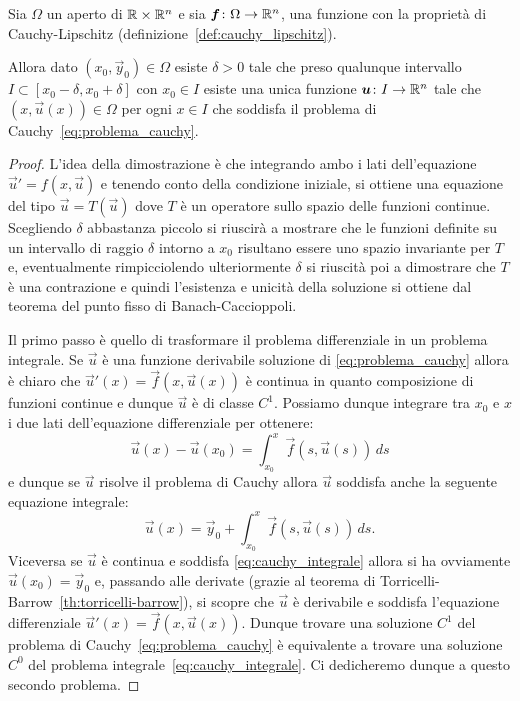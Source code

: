 \begin{theorem}
\label{th:cauchy_lipschitz}
\mymark{***}
Sia $\Omega$ un aperto di $\mathbb R\times \mathbb R^n$ e sia $\boldsymbol f\colon \Omega \to \mathbb R^n$,
una funzione con la proprietà di Cauchy-Lipschitz
(definizione~\ref{def:cauchy_lipschitz}).

Allora dato $(x_0,\vec y_0)\in \Omega$
esiste $\delta>0$
tale che preso qualunque intervallo $I\subset [x_0-\delta,x_0+\delta]$
con $x_0\in I$
esiste una unica funzione $\boldsymbol u\colon I \to \mathbb R^n$
tale che $(x,\vec u(x))\in \Omega$ per ogni $x\in I$
che soddisfa il problema di Cauchy~\eqref{eq:problema_cauchy}.
\end{theorem}
%
%
\begin{proof}
\mymark{***}
L'idea della dimostrazione è che integrando ambo i lati dell'equazione
$\vec u' = f(x,\vec u)$ e tenendo conto della condizione iniziale, si
ottiene una equazione del tipo $\vec u = T(\vec u)$ dove $T$ è un operatore
sullo spazio delle funzioni continue.
Scegliendo $\delta$ abbastanza piccolo si riuscirà a mostrare che le funzioni
definite su un intervallo di raggio $\delta$ intorno a $x_0$ risultano
essere uno spazio invariante per $T$ e, eventualmente rimpicciolendo ulteriormente
$\delta$ si riuscità poi a dimostrare che $T$ è una contrazione e quindi
l'esistenza e unicità della soluzione si ottiene
dal teorema del punto fisso di Banach-Caccioppoli.

Il primo passo è quello di trasformare il problema differenziale in un problema
integrale.
Se $\vec u$ è una funzione derivabile soluzione di \eqref{eq:problema_cauchy}
allora è chiaro che $\vec u'(x) = \vec f(x,\vec u(x))$ è continua in quanto
composizione di funzioni continue e dunque $\vec u$ è di classe $C^1$.
Possiamo dunque integrare tra $x_0$ e $x$ i due lati dell'equazione
differenziale per ottenere:
\[
  \vec u(x) - \vec u(x_0) = \int_{x_0}^x \vec f(s,\vec u(s))\, ds
\]
e dunque se $\vec u$ risolve il problema di Cauchy allora $\vec u$ soddisfa anche
la seguente equazione integrale:
\begin{equation}\label{eq:cauchy_integrale}
  \vec u(x) = \vec y_0 + \int_{x_0}^x \vec f(s,\vec u(s))\, ds.
\end{equation}
Viceversa se $\vec u$ è continua e soddisfa \eqref{eq:cauchy_integrale}
allora si ha ovviamente
$\vec u(x_0) = \vec y_0$ e,
passando alle derivate (grazie al teorema di Torricelli-Barrow~\ref{th:torricelli-barrow}),
si scopre che $\vec u$ è
derivabile e soddisfa l'equazione differenziale $\vec u'(x) = \vec f(x,\vec u(x))$.
Dunque trovare una soluzione $C^1$ del problema di Cauchy~\eqref{eq:problema_cauchy}
è equivalente a trovare una soluzione $C^0$ del problema integrale~\eqref{eq:cauchy_integrale}.
Ci dedicheremo dunque a questo secondo problema.


\end{proof}
